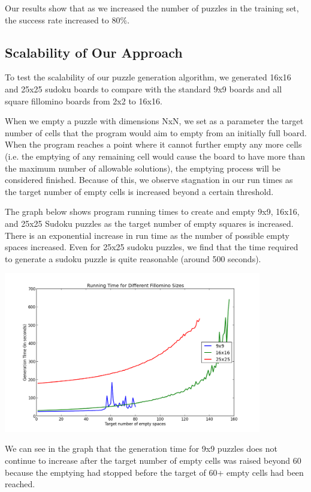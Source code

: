 Our results show that as we increased the number of puzzles in the training set, the success rate increased to $80 \%$.

\subsection{Scalability of Our Approach}

To test the scalability of our puzzle generation algorithm, we generated 16x16 and 25x25 sudoku boards to compare with the standard 9x9 boards and all square fillomino boards from 2x2 to 16x16.

When we empty a puzzle with dimensions NxN, we set as a parameter the target number of cells that the program would aim to empty from an initially full board. When the program reaches a point where it cannot further empty any more cells (i.e. the emptying of any remaining cell would cause the board to have more than the maximum number of allowable solutions), the emptying process will be considered finished. Because of this, we observe stagnation in our run times as the target number of empty cells is increased beyond a certain threshold. 

The graph below shows program running times to create and empty 9x9, 16x16, and 25x25 Sudoku puzzles as the target number of empty squares is increased. There is an exponential increase in run time as the number of possible empty spaces increased. Even for 25x25 sudoku puzzles, we find that the time required to generate a sudoku puzzle is quite reasonable (around 500 seconds).

\centerline{\includegraphics[height = 7cm]{sudoku2.png}}

We can see in the graph that the generation time for 9x9 puzzles does not continue to increase after the target number of empty cells was raised beyond 60 because the emptying had stopped before the target of 60+ empty cells had been reached. 

